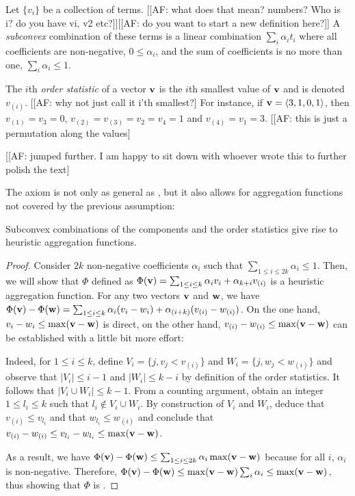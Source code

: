 Let $\{ v_i \}$ be a collection of terms. [[AF: what does that mean? numbers? Who is i? do you have vi, v2 etc?]][[AF: do you want to start a new definition here?]]
A \emph{subconvex} combination of these terms is a linear combination $\sum_i \alpha_i t_i$ where all coefficients are non-negative, $0 \leq \alpha_i$, and the sum of coefficients is no more than one, $\sum_i \alpha_i \leq 1$.

The $i$th \emph{order statistic} of a vector $\mathbf{v}$ is the $i$th smallest value of $\mathbf{v}$ and is denoted $v_{(i)}$. [[AF: why not just call it i'th smallest?]
For instance, if $\mathbf{v} = \left \langle 3, 1, 0, 1 \right \rangle $, then $v_{(1)} = v_3 = 0$, $v_{(2)} = v_{(3)} = v_2 = v_4 = 1$ and $v_{(4)} = v_1 = 3$. [[AF: this is just a permutation along the values]

[[AF: jumped further. I am happy to sit down with whoever wrote this to further polish the text]

The \axiomcons axiom is not only as general as \axiomadm, but it also allows for aggregation functions not covered by the previous assumption:
\begin{theorem}
  \label{thm:subconvex}
  Subconvex combinations of the components and the order statistics give rise to \axiomcons heuristic aggregation functions.
\end{theorem}
\begin{proof}
  Consider $2k$ non-negative coefficients $\alpha_i$ such that $\sum_{1 \leq i \leq 2k} \alpha_i \leq 1$.
  Then, we will show that $\Phi$ defined as $\Phi(\mathbf{v}) = \sum_{1 \leq i \leq k} \alpha_i v_i + \alpha_{k+i} v_{(i)}$ is a heuristic aggregation function.
  For any two vectors $\mathbf{v}$ and $\mathbf{w}$, we have $\Phi(\mathbf{v}) - \Phi(\mathbf{w}) = \sum_{1 \leq i \leq k} \alpha_i (v_i - w_i) + \alpha_{(i+k)} (v_{(i)} - w_{(i)})$.
  On the one hand, $v_i - w_i \leq \max (\mathbf{v} - \mathbf{w})$ is direct, on the other hand, $v_{(i)} - w_{(i)} \leq \max (\mathbf{v} - \mathbf{w})$ can be established with a little bit more effort:

  Indeed, for $1 \leq i \leq k$, define $V_i = \{j, v_j < v_{(i)} \}$ and $W_i = \{j, w_j < w_{(i)} \}$ and observe that $|V_i| \leq i - 1$ and $|W_i| \leq k - i$ by definition of the order statistics.
  It follows that $|V_i \cup W_i| \leq k - 1$.
  From a counting argument, obtain an integer $1 \leq l_i \leq k$ such that $l_i \notin V_i \cup W_i$.
  By construction of $V_i$ and $W_i$, deduce that $v_{(i)} \leq v_{l_i}$ and that $w_{l_i} \leq w_{(i)}$ and conclude that $v_{(i)} - w_{(i)} \leq v_{l_i} - w_{l_i} \leq \max (\mathbf{v} - \mathbf{w})$.

  As a result, we have $\Phi(\mathbf{v}) - \Phi(\mathbf{w}) \leq \sum_{1 \leq i \leq 2k} \alpha_i \max(\mathbf{v} - \mathbf{w})$ because for all $i$, $\alpha_i$ is non-negative.
  Therefore, $\Phi(\mathbf{v}) - \Phi(\mathbf{w}) \leq \max(\mathbf{v} - \mathbf{w}) \sum_i \alpha_i \leq \max(\mathbf{v} - \mathbf{w})$, thus showing that $\Phi$ is \axiomcons.
\end{proof}


